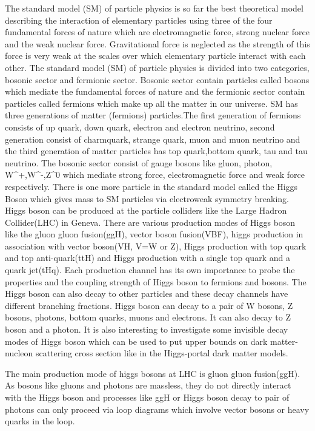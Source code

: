 \documentclass[final,3p]{CSP}
\begin{document}
The standard model (SM) of particle physics is so far the best theoretical model describing the interaction of elementary 
particles using three of the four fundamental forces of nature which are electromagnetic force, strong nuclear force and the weak
nuclear force. Gravitational force is neglected as the strength of this force is very weak at the scales over which elementary 
particle interact with each other. The standard model (SM) of particle physics is divided into two categories, bosonic sector 
and fermionic sector. Bosonic sector contain particles called bosons which mediate the fundamental forces of nature and the
fermionic sector contain particles called fermions which make up all the matter in our universe. SM has three generations of 
matter (fermions) particles.The first generation of fermions consists of up quark, down quark, electron and electron neutrino,
second generation consist of charmquark, strange quark, muon and muon neutrino and the third generation of matter particles has
top quark,bottom quark, tau and tau neutrino. The bosonic sector consist of gauge bosons like gluon, photon, W^+,W^-,Z^0 which 
mediate strong force, electromagnetic force and weak force respectively. There is one more particle in the standard model called
the Higgs Boson which gives mass to SM particles via electroweak symmetry breaking. Higgs boson can be produced at the particle
colliders like the Large Hadron Collider(LHC) in Geneva. There are various production modes of Higgs boson like the gluon gluon 
fusion(ggH), vector boson fusion(VBF), higgs production in association with vector boson(VH, V=W or Z), Higgs production with top
quark and top anti-quark(ttH) and Higgs production with a single top quark and a quark jet(tHq). Each production channel has its
own importance to probe the properties and the coupling strength of Higgs boson to fermions and bosons. The Higgs boson can also
decay to other particles and these decay channels have different branching fractions. Higgs boson can decay to a pair of W
bosons, Z bosons, photons, bottom quarks, muons and electrons. It can also decay to Z boson and a photon. It is also interesting
to investigate some invisible decay modes of Higgs boson which can be used to put upper bounds on dark matter-nucleon scattering 
cross section like in the Higgs-portal dark matter models.

The main production mode of higgs bosons at LHC is gluon gluon fusion(ggH). As bosons like gluons and photons are massless, they do not directly interact with the Higgs boson and processes like ggH or Higgs boson decay to pair of photons can only proceed via loop diagrams which involve vector bosons or heavy quarks in the loop.
\end{document}
